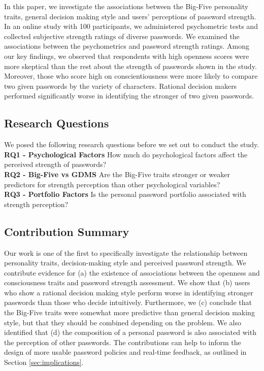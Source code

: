 In this paper, we investigate the associations between the Big-Five personality traits, general decision making style and users' perceptions of password strength. In an online study with 100 participants, we administered psychometric tests and collected subjective strength ratings of diverse passwords. We examined the associations between the psychometrics and password strength ratings. Among our key findings, we observed that respondents with high openness scores were more skeptical than the rest about the strength of passwords shown in the study. Moreover, those who score high on conscientiousness were more likely to compare two given passwords by the variety of characters. Rational decision makers performed significantly worse in identifying the stronger of two given passwords.

\subsection{Research Questions}
We posed the following research questions before we set out to conduct the study.\\
\textbf{RQ1 - Psychological Factors} How much do psychological factors affect the perceived strength of passwords?\\
\textbf{RQ2 - Big-Five vs GDMS} Are the Big-Five traits stronger or weaker predictors for strength perception than other psychological variables?\\
\textbf{RQ3 - Portfolio Factors} Is the personal password portfolio associated with strength perception?

\subsection{Contribution Summary}
Our work is one of the first to specifically investigate the relationship between personality traits, decision-making style and perceived password strength. We contribute evidence for (a) the existence of associations between the openness and consciousness traits and password strength assessment. We show that (b) users who show a rational decision making style perform worse in identifying stronger passwords than those who decide intuitively. Furthermore, we (c) conclude that the Big-Five traits were somewhat more predictive than general decision making style, but that they should be combined depending on the problem. We also identified that (d) the composition of a personal password is also associated with the perception of other passwords. The contributions can help to inform the design of more usable password policies and real-time feedback, as outlined in Section \ref{sec:implications}.


